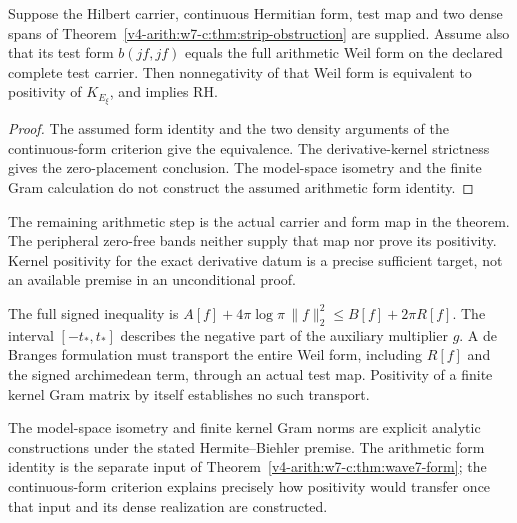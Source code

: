 \begin{theorem}
\label{v4-arith:w7-c:thm:wave7-form}
Suppose the Hilbert carrier, continuous Hermitian form, test map and
two dense spans of Theorem~\ref{v4-arith:w7-c:thm:strip-obstruction}
are supplied. Assume also that its test form \(b(jf,jf)\) equals
the full arithmetic Weil form on the declared complete test carrier.
Then nonnegativity of that Weil form is equivalent to positivity of
\(K_{E_\xi}\), and implies RH.
\end{theorem}
\begin{proof}
The assumed form identity and the two density arguments of the
continuous-form criterion give the equivalence. The derivative-kernel
strictness gives the zero-placement conclusion. The model-space
isometry and the finite Gram calculation do not construct the assumed
arithmetic form identity.
\end{proof}
\begin{remark}
\label{v4-arith:w7-c:rem:consequence}
The remaining arithmetic step is the actual carrier and form map
in the theorem. The peripheral zero-free bands neither supply that
map nor prove its positivity. Kernel positivity for the exact
derivative datum is a precise sufficient target, not an available
premise in an unconditional proof.
\end{remark}

\begin{remark}
\label{v4-arith:w7-c:rem:wave6-relation}
The full signed inequality is
\(A[f]+4\pi\log\pi\,\|f\|_2^2\leq B[f]+2\pi R[f]\).
The interval \([-t_*,t_*]\) describes the negative part of the
auxiliary multiplier \(g\). A de Branges formulation must transport
the entire Weil form, including \(R[f]\) and the signed
archimedean term, through an actual test map. Positivity of a finite
kernel Gram matrix by itself establishes no such transport.
\end{remark}

\begin{remark}
\label{v4-arith:w7-c:rem:honest-form}
The model-space isometry and finite kernel Gram norms are explicit
analytic constructions under the stated Hermite--Biehler premise.
The arithmetic form identity is the separate input of
Theorem~\ref{v4-arith:w7-c:thm:wave7-form}; the continuous-form
criterion explains precisely how positivity would transfer once
that input and its dense realization are constructed.
\end{remark}

